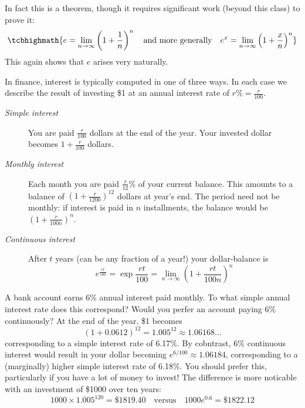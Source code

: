 In fact this is a theorem, though it requires significant work (beyond this class) to prove it:
\[
	\tcbhighmath{
		e =\lim_{n\to\infty}\left(1+\frac 1n\right)^n
		\quad\text{and more generally}\quad 
		e^x =\lim_{n\to\infty}\left(1+\frac xn\right)^n
	}
\]
This again shows that $e$ arises very naturally.



In finance, interest is typically computed in one of three ways. In each case we describe the result of investing \$1 at an annual interest rate of $r\%=\frac r{100}$.
\begin{description}
	\item[\normalfont\emph{Simple interest}] You are paid $\frac r{100}$ dollars at the end of the year. Your invested dollar becomes $1+\frac r{100}$ dollars.
	\item[\normalfont\emph{Monthly interest}] Each month you are paid $\frac r{12}$\% of your current balance. This amounts to a balance of $(1+\frac r{1200})^{12}$ dollars at year's end. The period need not be monthly: if interest is paid in $n$ installments, the balance would be $(1+\frac r{100n})^{n}$.
	\item[\normalfont\emph{Continuous interest}] After $t$ years (can be any fraction of a year!) your dollar-balance is
	\[
		e^{\frac{rt}{100}}=\exp\frac{rt}{100} =\lim_{n\to\infty}\left(1+\frac{rt}{100n}\right)^n
	\]
\end{description}


\begin{example}{}{}
	A bank account earns 6\% annual interest paid monthly. To what simple annual interest rate does this correspond? Would you perfer an account paying 6\% continuously?\smallbreak
	At the end of the year, \$1 becomes
	\[
	 	\left(1+{0.06}{12}\right)^{12}=1.005^{12}\approx 1.06168\ldots
	\]
	corresponding to a simple interest rate of 6.17\%. By cobntrast, 6\% continuous interest would result in your dollar becoming $e^{6/100}\approx 1.06184$, corresponding to a (marginally) higher simple interest rate of 6.18\%. You should prefer this, particularly if you have a lot of money to invest! The difference is more noticable with an investment of \$1000 over ten years:
	\[
		1000\times 1.005^{120}=\$1819.40
		\quad\text{versus}\quad
		1000e^{0.6}=\$1822.12
	\]
\end{example}


\goodbreak


